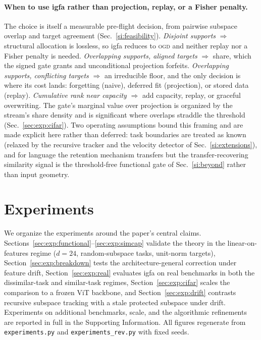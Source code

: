 \documentclass[10pt,a4paper]{article}
\theoremstyle{plain}
\theoremstyle{definition}
\newcommand{\IGFA}{igfa}
\newcommand{\OGD}{\textsc{ogd}}
\begin{document}
\paragraph{When to use \IGFA{} rather than projection, replay, or a Fisher penalty.} The
choice is itself a measurable pre-flight decision, from pairwise subspace overlap and
target agreement (Sec.~\ref{si:feasibility}). \emph{Disjoint supports} $\Rightarrow$
structural allocation is lossless, so \IGFA{} reduces to \OGD{} and neither replay nor a
Fisher penalty is needed. \emph{Overlapping supports, aligned targets} $\Rightarrow$
share, which the signed gate grants and unconditional projection forfeits.
\emph{Overlapping supports, conflicting targets} $\Rightarrow$ an irreducible floor, and
the only decision is where its cost lands: forgetting (naive), deferred fit (projection),
or stored data (replay). \emph{Cumulative rank near capacity} $\Rightarrow$ add capacity,
replay, or graceful overwriting. The gate's marginal value over projection is organized by
the stream's share density and is significant where overlaps straddle the
threshold (Sec.~\ref{sec:exp:cifar}). Two operating assumptions bound this framing and are
made explicit here rather than deferred: task boundaries are treated as known (relaxed by
the recursive tracker and the velocity detector of Sec.~\ref{si:extensions}), and for
language the retention mechanism transfers but the transfer-recovering similarity signal
is the threshold-free functional gate of Sec.~\ref{si:beyond} rather than input geometry.

\section{Experiments}
\label{sec:exp}

We organize the experiments around the paper's central claims.
Sections~\ref{sec:exp:functional}--\ref{sec:exp:simcap} validate the theory in the
linear-on-features regime ($d=24$, random-subspace tasks, unit-norm targets),
Section~\ref{sec:exp:breakdown} tests the architecture-general correction under feature
drift, Section~\ref{sec:exp:real} evaluates \IGFA{} on real benchmarks in both the
dissimilar-task and similar-task regimes, Section~\ref{sec:exp:cifar} scales the comparison
to a frozen ViT backbone, and Section~\ref{sec:exp:drift} contrasts
recursive subspace tracking with a stale protected subspace under drift. Experiments on
additional benchmarks, scale,
and the algorithmic refinements are reported in full in the Supporting Information. All
figures regenerate from \texttt{experiments.py} and \texttt{experiments\_rev.py} with
fixed seeds.
\end{document}
